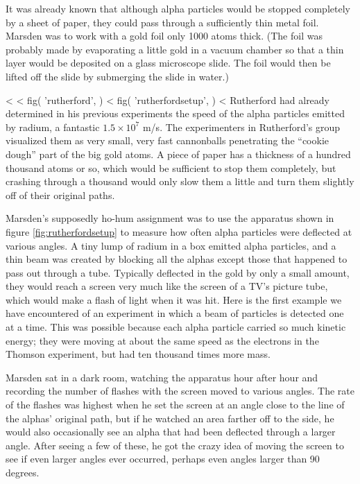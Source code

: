         It was already known that although alpha particles would be
        stopped completely by a sheet of paper, they could pass
        through a sufficiently thin metal foil. Marsden was to work
        with a gold foil only 1000 atoms thick. (The foil was
        probably made by evaporating a little gold in a vacuum
        chamber so that a thin layer would be deposited on a glass
        microscope slide. The foil would then be lifted off the
        slide by submerging the slide in water.) 

<%
<%
  fig(
    'rutherford',
  )
\spacebetweenfigs
<%
  fig(
    'rutherfordsetup',
  )
<%
        Rutherford had already determined in his previous experiments
        the speed of the alpha particles emitted by radium, a
        fantastic $1.5\times10^7$  m/s. The experimenters in
        Rutherford's group visualized them as very small, very fast
        cannonballs penetrating the ``cookie dough'' part of the big
        gold atoms. A piece of paper has a thickness of a hundred
        thousand atoms or so, which would be sufficient to stop them
        completely, but crashing through a thousand would only slow
        them a little and turn them slightly off of their original paths. 

        Marsden's supposedly ho-hum assignment was to use the
        apparatus shown in figure \ref{fig:rutherfordsetup} to measure how often alpha
        particles were deflected at various angles. A tiny lump of
        radium in a box emitted alpha particles, and a thin beam was
        created by blocking all the alphas except those that
        happened to pass out through a tube. Typically deflected in
        the gold by only a small amount, they would reach a screen
        very much like the screen of a TV's picture tube, which
        would make a flash of light when it was hit. Here is the
        first example we have encountered of an experiment in which
        a beam of particles is detected one at a time. This was
        possible because each alpha particle carried so much kinetic
        energy; they were moving at about the same speed as the
        electrons in the Thomson experiment, but had ten thousand times more mass.

        Marsden sat in a dark room, watching the apparatus hour
        after hour and recording the number of flashes with the
        screen moved to various angles. The rate of the flashes was
        highest when he set the screen at an angle close to the line
        of the alphas' original path, but if he watched an area
        farther off to the side, he would also occasionally see an
        alpha that had been deflected through a larger angle. After
        seeing a few of these, he got the crazy idea of moving the
        screen to see if even larger angles ever occurred, perhaps
        even angles larger than 90 degrees.
        
